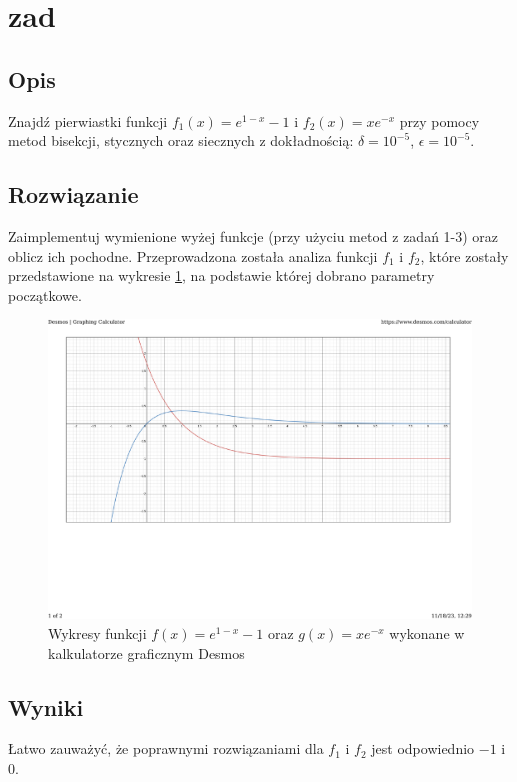 \documentclass[10pt,a4paper, polish]{article}
\begin{document}
\section{zad}
\subsection*{Opis}
Znajdź pierwiastki funkcji $f_1(x)=e^{1-x}-1$ i $f_2(x)=xe^{-x}$ przy pomocy metod bisekcji, stycznych oraz siecznych z dokładnością: $\delta=10^{-5}$, $\epsilon=10^{-5}$.

\subsection*{Rozwiązanie}
Zaimplementuj wymienione wyżej funkcje (przy użyciu metod z zadań 1-3) oraz oblicz ich pochodne. Przeprowadzona została analiza funkcji $f_1$ i $f_2$, które zostały przedstawione na wykresie \ref{fig:zad61}, na podstawie której dobrano parametry początkowe.

\begin{figure}[H]
\centering
\includegraphics[width=1\textwidth]{zad6_1}\hfill
\caption{Wykresy funkcji $f(x)=e^{1-x}-1$ oraz $g(x)=xe^{-x}$ wykonane w kalkulatorze graficznym Desmos} \label{fig:zad61}
\end{figure} 

\subsection*{Wyniki}
Łatwo zauważyć, że poprawnymi rozwiązaniami dla $f_1$ i $f_2$ jest odpowiednio $-1$ i $0$.
\end{document}
